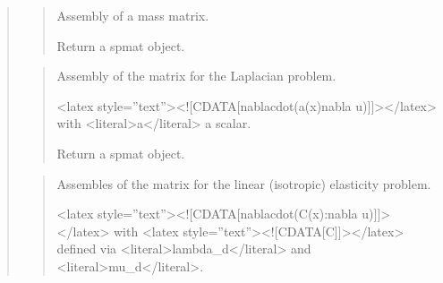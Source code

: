 \documentclass[a4paper,11pt,english]{sphinxmanual}
\begin{document}
\begin{quote}
\begin{quote}
\begin{sphinxVerbatim}[commandchars=\\\{\}]
            
\end{sphinxVerbatim}
\end{quote}

\sphinxAtStartPar
{}
\begin{quote}

\sphinxAtStartPar
Assembly of a mass matrix.

\sphinxAtStartPar
Return a spmat object.
\end{quote}

\sphinxAtStartPar
{}
\begin{quote}

\sphinxAtStartPar
Assembly of the matrix for the Laplacian problem.

\sphinxAtStartPar
\textless{}latex style=”text”\textgreater{}\textless{}!{[}CDATA{[}nablacdot(a(x)nabla u){]}{]}\textgreater{}\textless{}/latex\textgreater{}  with \textless{}literal\textgreater{}a\textless{}/literal\textgreater{} a scalar.

\sphinxAtStartPar
Return a spmat object.
\end{quote}

\sphinxAtStartPar
{}
\begin{quote}

\sphinxAtStartPar
Assembles of the matrix for the linear (isotropic) elasticity problem.

\sphinxAtStartPar
\textless{}latex style=”text”\textgreater{}\textless{}!{[}CDATA{[}nablacdot(C(x):nabla u){]}{]}\textgreater{}\textless{}/latex\textgreater{}
with \textless{}latex style=”text”\textgreater{}\textless{}!{[}CDATA{[}C{]}{]}\textgreater{}\textless{}/latex\textgreater{} defined via \textless{}literal\textgreater{}lambda\_d\textless{}/literal\textgreater{} and \textless{}literal\textgreater{}mu\_d\textless{}/literal\textgreater{}.


\end{quote}
\end{quote}
\end{document}
